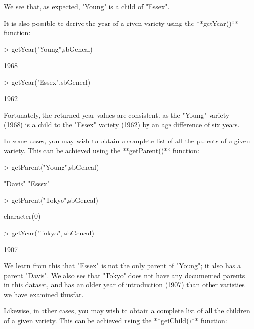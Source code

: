 \documentclass{article}
\numberwithin{equation}{section} %
\begin{document}
We see that, as expected, "Young" is a child of "Essex".

It is also possible to derive the year of a given variety using the **getYear()** function:

\begin{Schunk}
\begin{Sinput}
> getYear("Young",sbGeneal)
\end{Sinput}
\begin{Soutput}
[1] 1968
\end{Soutput}
\begin{Sinput}
> getYear("Essex",sbGeneal)
\end{Sinput}
\begin{Soutput}
[1] 1962
\end{Soutput}
\end{Schunk}

Fortunately, the returned year values are consistent, as the "Young" variety (1968) is a child to the "Essex" variety (1962) by an age difference of six years.

In some cases, you may wish to obtain a complete list of all the parents of a given variety. This can be achieved using the **getParent()** function:

\begin{Schunk}
\begin{Sinput}
> getParent("Young",sbGeneal)
\end{Sinput}
\begin{Soutput}
[1] "Davis" "Essex"
\end{Soutput}
\begin{Sinput}
> getParent("Tokyo",sbGeneal)
\end{Sinput}
\begin{Soutput}
character(0)
\end{Soutput}
\begin{Sinput}
> getYear("Tokyo", sbGeneal)
\end{Sinput}
\begin{Soutput}
[1] 1907
\end{Soutput}
\end{Schunk}

We learn from this that "Essex" is not the only parent of "Young"; it also has a parent "Davis". We also see that "Tokyo" does not have any documented parents in this dataset, and has an older year of introduction (1907) than other varieties we have examined thusfar.

Likewise, in other cases, you may wish to obtain a complete list of all the children of a given variety. This can be achieved using the **getChild()** function:
\end{document}
